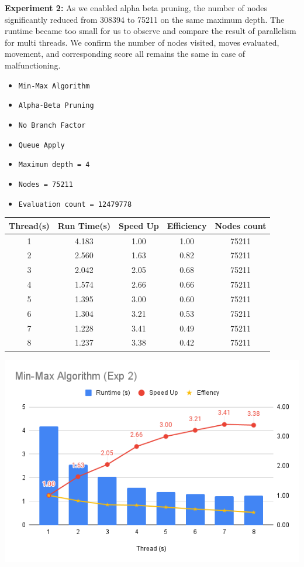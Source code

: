 \documentclass[sigconf]{acmart}
\begin{document}
{\bfseries Experiment 2:}
As we enabled alpha beta pruning, the number of nodes significantly reduced from 308394 to 75211 on the same maximum depth. The runtime became too small for us to observe and compare the result of parallelism for multi threads. We confirm the number of nodes visited, moves evaluated, movement, and corresponding score all remains the same in case of malfunctioning. 
\begin{itemize}
\item {\verb|Min-Max Algorithm|}
\item {\verb|Alpha-Beta Pruning|}
\item {\verb|No Branch Factor|}
\item {\verb|Queue Apply|}
\item {\verb|Maximum depth = 4|}
\item {\verb|Nodes = 75211|}
\item {\verb|Evaluation count = 12479778|}
\end{itemize}
\begin{center}
  \label{tab:commands}
  \begin{tabular}{c c c c c}
    \toprule
    Thread(s)& Run Time(s) & Speed Up & Efficiency & Nodes count\\
    \midrule
    1 & 4.183 & 1.00 & 1.00 & 75211\\
    2 & 2.560 & 1.63 & 0.82 & 75211\\
    3 & 2.042 & 2.05 & 0.68 & 75211\\
    4 & 1.574 & 2.66 & 0.66 & 75211\\
    5 & 1.395 & 3.00 & 0.60 & 75211\\
    6 & 1.304 & 3.21 & 0.53 & 75211\\
    7 & 1.228 & 3.41 & 0.49 & 75211\\
    8 & 1.237 & 3.38 & 0.42 & 75211\\
    \bottomrule
  \end{tabular}
\end{center}
\includegraphics[scale=0.40]{images/exp2.png}
\end{document}
